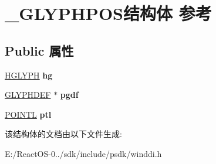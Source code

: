 \hypertarget{struct___g_l_y_p_h_p_o_s}{}\section{\+\_\+\+G\+L\+Y\+P\+H\+P\+O\+S结构体 参考}
\label{struct___g_l_y_p_h_p_o_s}
\subsection*{Public 属性}
\begin{DoxyCompactItemize}
\item 
\mbox{\label{struct___g_l_y_p_h_p_o_s_a6794212403b07791ed9038d0990e21b2}} 
\hyperlink{interfacevoid}{H\+G\+L\+Y\+PH} {\bfseries hg}
\item 
\mbox{\label{struct___g_l_y_p_h_p_o_s_a2e8daf09b9005224b73b99c7ac639b3d}} 
\hyperlink{union___g_l_y_p_h_d_e_f}{G\+L\+Y\+P\+H\+D\+EF} $\ast$ {\bfseries pgdf}
\item 
\mbox{\label{struct___g_l_y_p_h_p_o_s_a52289211f755d9ff7cfb004d37250217}} 
\hyperlink{struct___p_o_i_n_t_l}{P\+O\+I\+N\+TL} {\bfseries ptl}
\end{DoxyCompactItemize}


该结构体的文档由以下文件生成\+:\begin{DoxyCompactItemize}
\item 
E\+:/\+React\+O\+S-\/0../sdk/include/psdk/winddi.\+h\end{DoxyCompactItemize}
